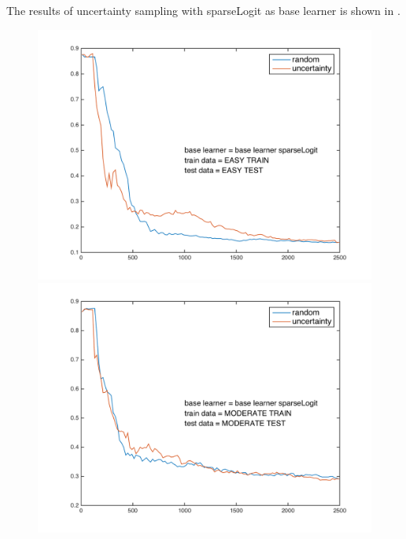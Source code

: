 \documentclass{article}
\begin{document}
The results of uncertainty sampling with sparseLogit as base learner is shown in . 
  \begin{figure}[!ht]
    \begin{minipage}{.31\textwidth}
      \centering
      \includegraphics[width=1\linewidth]{../sparseLogit_simple}
    \end{minipage}
    \hfill
    \begin{minipage}{.31\textwidth}
      \centering
      \includegraphics[width=1\linewidth]{../sparseLogit_moderate}
    \end{minipage}
    \hfill
    \centering
    \begin{minipage}{.31\textwidth}
      \centering

\end{minipage}
\end{figure}
\end{document}

